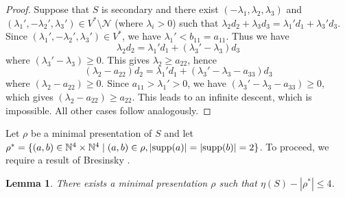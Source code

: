 \documentclass[12pt]{article}
\newtheorem{lemma}[thm]{Lemma}
\theoremstyle{remark}
\begin{document}
\begin{proof}
   Suppose that $S$ is secondary and there exist $(-\lambda_1,\lambda_2,\lambda_3)$ and $(\lambda_1',-\lambda_2',\lambda_3') \in V^* \setminus \mathcal{N}$ (where $\lambda_i > 0$) such that $\lambda_2d_2 + \lambda_3d_3 = \lambda_1'd_1 + \lambda_3'd_3$. Since $(\lambda_1',-\lambda_2',\lambda_3') \in V^*$, we have $\lambda_1' < b_{11} = a_{11}$. Thus we have
   \begin{equation}
       \lambda_2d_2 = \lambda_1'd_1 + (\lambda_3'-\lambda_3)d_3
   \end{equation}
   where $(\lambda_3'-\lambda_3) \geq 0$. This gives $\lambda_2 \geq a_{22}$, hence
   \begin{equation}
       (\lambda_2-a_{22})d_2 = \lambda_1'd_1 + (\lambda_3'-\lambda_3-a_{33})d_3
   \end{equation}
   where $(\lambda_2-a_{22}) \geq 0$. Since $a_{11} > \lambda_1' > 0$, we have $(\lambda_3'-\lambda_3-a_{33}) \geq 0$, which gives $(\lambda_2-a_{22}) \geq a_{22}$. This leads to an infinite descent, which is impossible. 
   All other cases follow analogously.
\end{proof}


Let $\rho$ be a minimal presentation of $S$ and let $\rho^* = \{(a,b) \in \mathbb{N}^{4} \times \mathbb{N}^{4}  \mid (a,b) \in \rho, |\textup{supp}(a) | = | \textup{supp}(b) | =2 \} $. To proceed, we require a result of Bresinsky \cite{Bresinsky1988}. 

\begin{lemma}\label{lemma_rho_bresinsky}
   \textup{\cite[Corollary 2]{Bresinsky1988}} There exists a minimal presentation $\rho$ such that $\eta(S) - |\rho^*| \leq 4$.
\end{lemma}
\end{document}
